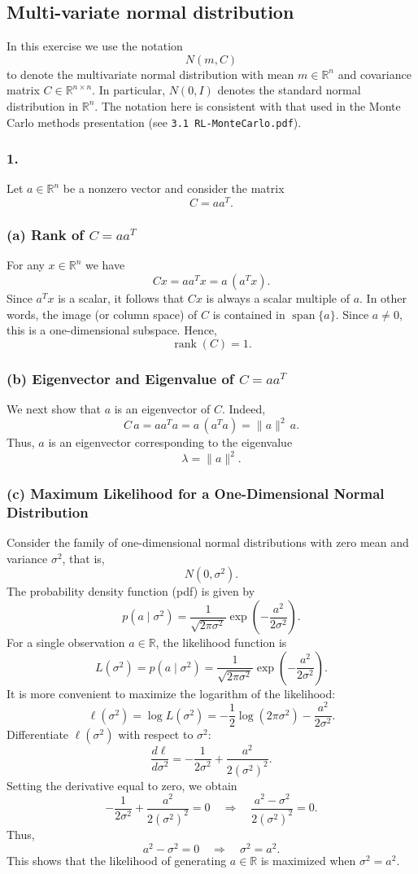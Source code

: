 \subsection{Multi-variate normal distribution}

In this exercise we use the notation 
\[
N(m,C)
\]
to denote the multivariate normal distribution with mean $m\in\mathbb{R}^n$ and covariance matrix $C\in\mathbb{R}^{n\times n}$. In particular, $N(0,I)$ denotes the standard normal distribution in $\mathbb{R}^n$. The notation here is consistent with that used in the Monte Carlo methods presentation (see \texttt{3.1 RL-MonteCarlo.pdf}).

\subsubsection*{1.}
Let $a\in\mathbb{R}^n$ be a nonzero vector and consider the matrix
\[
C = aa^T.
\]

\subsubsection*{(a) Rank of $C=aa^T$}
For any $x\in\mathbb{R}^n$ we have
\[
C x = aa^T x = a \, (a^T x).
\]
Since $a^T x$ is a scalar, it follows that $Cx$ is always a scalar multiple of $a$. In other words, the image (or column space) of $C$ is contained in $\operatorname{span}\{a\}$. Since $a\neq 0$, this is a one-dimensional subspace. Hence, 
\[
\operatorname{rank}(C)=1.
\]

\subsubsection*{(b) Eigenvector and Eigenvalue of $C=aa^T$}
We next show that $a$ is an eigenvector of $C$. Indeed,
\[
C\,a = aa^T a = a\,(a^T a) = \|a\|^2\,a.
\]
Thus, $a$ is an eigenvector corresponding to the eigenvalue 
\[
\lambda = \|a\|^2.
\]

\subsubsection*{(c) Maximum Likelihood for a One-Dimensional Normal Distribution}
Consider the family of one-dimensional normal distributions with zero mean and variance $\sigma^2$, that is, 
\[
N(0,\sigma^2).
\]
The probability density function (pdf) is given by
\[
p(a\mid \sigma^2)=\frac{1}{\sqrt{2\pi\sigma^2}}\exp\left(-\frac{a^2}{2\sigma^2}\right).
\]
For a single observation $a\in\mathbb{R}$, the likelihood function is
\[
L(\sigma^2)=p(a\mid \sigma^2)=\frac{1}{\sqrt{2\pi\sigma^2}}\exp\left(-\frac{a^2}{2\sigma^2}\right).
\]
It is more convenient to maximize the logarithm of the likelihood:
\[
\ell(\sigma^2)=\log L(\sigma^2)=-\frac{1}{2}\log(2\pi\sigma^2)-\frac{a^2}{2\sigma^2}.
\]
Differentiate $\ell(\sigma^2)$ with respect to $\sigma^2$:
\[
\frac{d\ell}{d\sigma^2}=-\frac{1}{2\sigma^2}+\frac{a^2}{2(\sigma^2)^2}.
\]
Setting the derivative equal to zero, we obtain
\[
-\frac{1}{2\sigma^2}+\frac{a^2}{2(\sigma^2)^2}=0 
\quad\Longrightarrow\quad \frac{a^2-\sigma^2}{2(\sigma^2)^2}=0.
\]
Thus,
\[
a^2-\sigma^2=0\quad\Longrightarrow\quad \sigma^2=a^2.
\]
This shows that the likelihood of generating $a\in\mathbb{R}$ is maximized when $\sigma^2=a^2$.